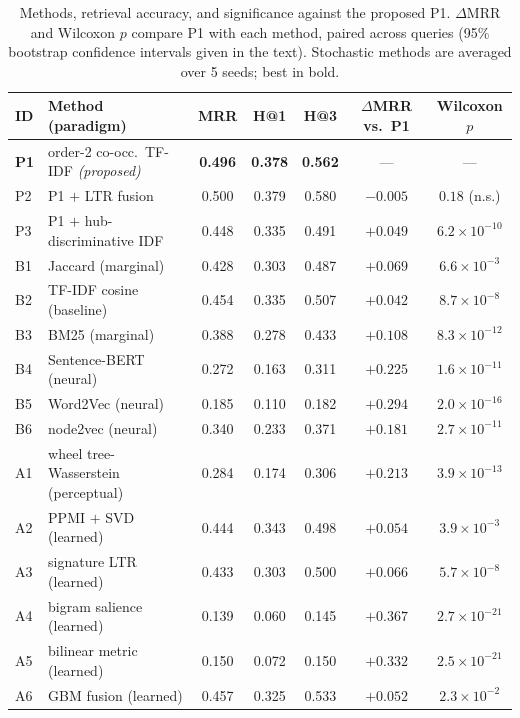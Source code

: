 \documentclass[conference]{IEEEtran}
\begin{document}
\begin{table}[t]
\caption{Methods, retrieval accuracy, and significance against the proposed P1. $\Delta$MRR
and Wilcoxon $p$ compare P1 with each method, paired across queries (95\% bootstrap
confidence intervals given in the text). Stochastic methods are averaged over 5 seeds; best
in bold.}
\begin{center}
\begin{tabular}{llccccc}
\toprule
\textbf{ID} & \textbf{Method (paradigm)} & \textbf{MRR} & \textbf{H@1} & \textbf{H@3} & \textbf{$\Delta$MRR vs.\ P1} & \textbf{Wilcoxon $p$} \\
\midrule
\textbf{P1} & order-2 co-occ.\ TF-IDF \textit{(proposed)} & \textbf{0.496} & \textbf{0.378} & \textbf{0.562} & --- & --- \\
P2 & P1 $+$ LTR fusion & 0.500 & 0.379 & 0.580 & $-0.005$ & $0.18$ (n.s.) \\
P3 & P1 $+$ hub-discriminative IDF & 0.448 & 0.335 & 0.491 & $+0.049$ & $6.2\times10^{-10}$ \\
\midrule
B1 & Jaccard (marginal) & 0.428 & 0.303 & 0.487 & $+0.069$ & $6.6\times10^{-3}$ \\
B2 & TF-IDF cosine (baseline) & 0.454 & 0.335 & 0.507 & $+0.042$ & $8.7\times10^{-8}$ \\
B3 & BM25 (marginal) & 0.388 & 0.278 & 0.433 & $+0.108$ & $8.3\times10^{-12}$ \\
B4 & Sentence-BERT (neural) & 0.272 & 0.163 & 0.311 & $+0.225$ & $1.6\times10^{-11}$ \\
B5 & Word2Vec (neural) & 0.185 & 0.110 & 0.182 & $+0.294$ & $2.0\times10^{-16}$ \\
B6 & node2vec (neural) & 0.340 & 0.233 & 0.371 & $+0.181$ & $2.7\times10^{-11}$ \\
A1 & wheel tree-Wasserstein (perceptual) & 0.284 & 0.174 & 0.306 & $+0.213$ & $3.9\times10^{-13}$ \\
A2 & PPMI $+$ SVD (learned) & 0.444 & 0.343 & 0.498 & $+0.054$ & $3.9\times10^{-3}$ \\
A3 & signature LTR (learned) & 0.433 & 0.303 & 0.500 & $+0.066$ & $5.7\times10^{-8}$ \\
A4 & bigram salience (learned) & 0.139 & 0.060 & 0.145 & $+0.367$ & $2.7\times10^{-21}$ \\
A5 & bilinear metric (learned) & 0.150 & 0.072 & 0.150 & $+0.332$ & $2.5\times10^{-21}$ \\
A6 & GBM fusion (learned) & 0.457 & 0.325 & 0.533 & $+0.052$ & $2.3\times10^{-2}$ \\
\bottomrule
\end{tabular}
\label{tab:results}
\end{center}
\end{table}
\end{document}
